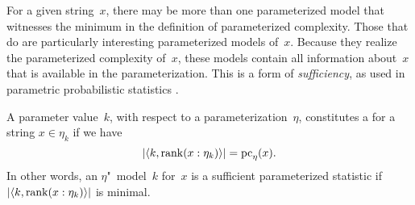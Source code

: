 For a given string~$x$, there may be more than one parameterized model that witnesses the minimum in the definition of parameterized complexity.
Those that do are particularly interesting parameterized models of~$x$.
Because they realize the parameterized complexity of~$x$, these models contain all information about~$x$ that is available in the parameterization.
This is a form of \emph{sufficiency}, as used in parametric probabilistic statistics \parencite[see also][Section~2.9]{cover2006elements}.
\begin{definition}
  A parameter value~$k$, with respect to a parameterization~$\eta$, constitutes a  for a string $x \in \eta_k$ if we have
  \begin{equation*}
    {\lvert{\langle k, \operatorname{rank}(x : \eta_k)\rangle}\rvert} = \operatorname{pc}_\eta(x).
  \end{equation*}
  In other words, an $\eta$"~model~$k$ for~$x$ is a sufficient parameterized statistic if ${\lvert{\langle k, \operatorname{rank}(x: \eta_k)\rangle}\rvert}$ is minimal.
\end{definition}

